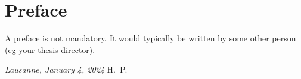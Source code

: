 \cleardoublepage
\chapter*{Preface}
A preface is not mandatory. It would typically be written by some other person (eg your thesis director).

\lipsum[1-2]

\bigskip

\noindent\textit{Lausanne, January 4, 2024}
\hfill H.~P.
